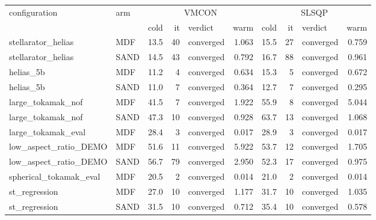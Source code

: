 \begin{tabular}{llrrlrrrlr}
\toprule
configuration & arm & \multicolumn{4}{c}{VMCON} & \multicolumn{4}{c}{SLSQP} \\
\cmidrule(lr){3-6}\cmidrule(lr){7-10}
 & & cold & it & verdict & warm & cold & it & verdict & warm \\
\midrule
stellarator\_helias & MDF & 13.5 & 40 & converged & 1.063 & 15.5 & 27 & converged & 0.759 \\
stellarator\_helias & SAND & 14.5 & 43 & converged & 0.792 & 16.7 & 88 & converged & 0.961 \\
helias\_5b & MDF & 11.2 & 4 & converged & 0.634 & 15.3 & 5 & converged & 0.672 \\
helias\_5b & SAND & 11.0 & 7 & converged & 0.364 & 12.7 & 7 & converged & 0.295 \\
large\_tokamak\_nof & MDF & 41.5 & 7 & converged & 1.922 & 55.9 & 8 & converged & 5.044 \\
large\_tokamak\_nof & SAND & 47.3 & 10 & converged & 0.928 & 63.7 & 13 & converged & 1.068 \\
large\_tokamak\_eval & MDF & 28.4 & 3 & converged & 0.017 & 28.9 & 3 & converged & 0.017 \\
low\_aspect\_ratio\_DEMO & MDF & 51.6 & 11 & converged & 5.922 & 53.7 & 12 & converged & 1.705 \\
low\_aspect\_ratio\_DEMO & SAND & 56.7 & 79 & converged & 2.950 & 52.3 & 17 & converged & 0.975 \\
spherical\_tokamak\_eval & MDF & 20.5 & 2 & converged & 0.014 & 21.0 & 2 & converged & 0.014 \\
st\_regression & MDF & 27.0 & 10 & converged & 1.177 & 31.7 & 10 & converged & 1.035 \\
st\_regression & SAND & 31.5 & 10 & converged & 0.712 & 35.4 & 10 & converged & 0.578 \\
\bottomrule
\end{tabular}
